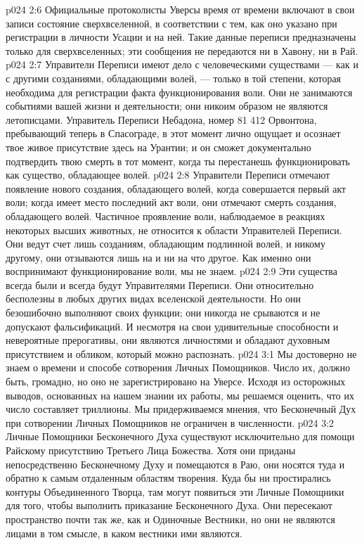 \vs p024 2:6 Официальные протоколисты Уверсы время от времени включают в свои записи состояние сверхвселенной, в соответствии с тем, как оно указано при регистрации в личности Усации и на ней. Такие данные переписи предназначены только для сверхвселенных; эти сообщения не передаются ни в Хавону, ни в Рай.
\vs p024 2:7 \pc Управители Переписи имеют дело с человеческими существами --- как и с другими созданиями, обладающими волей, --- только в той степени, которая необходима для регистрации факта функционирования воли. Они не занимаются событиями вашей жизни и деятельности; они никоим образом не являются летописцами. Управитель Переписи Небадона, номер 81 412 Орвонтона, пребывающий теперь в Спасограде, в этот момент лично ощущает и осознает твое живое присутствие здесь на Урантии; и он сможет документально подтвердить твою смерть в тот момент, когда ты перестанешь функционировать как существо, обладающее волей.
\vs p024 2:8 Управители Переписи отмечают появление нового создания, обладающего волей, когда совершается первый акт воли; когда имеет место последний акт воли, они отмечают смерть создания, обладающего волей. Частичное проявление воли, наблюдаемое в реакциях некоторых высших животных, не относится к области Управителей Переписи. Они ведут счет лишь созданиям, обладающим подлинной волей, и никому другому, они отзываются лишь на  и ни на что другое. Как именно они воспринимают функционирование воли, мы не знаем.
\vs p024 2:9 Эти существа всегда были и всегда будут Управителями Переписи. Они относительно бесполезны в любых других видах вселенской деятельности. Но они безошибочно выполняют своих функции; они никогда не срываются и не допускают фальсификаций. И несмотря на свои удивительные способности и невероятные прерогативы, они являются личностями и обладают духовным присутствием и обликом, который можно распознать.
\vs p024 3:1 Мы достоверно не знаем о времени и способе сотворения Личных Помощников. Число их, должно быть, громадно, но оно не зарегистрировано на Уверсе. Исходя из осторожных выводов, основанных на нашем знании их работы, мы решаемся оценить, что их число составляет триллионы. Мы придерживаемся мнения, что Бесконечный Дух при сотворении Личных Помощников не ограничен в численности.
\vs p024 3:2 Личные Помощники Бесконечного Духа существуют исключительно для помощи Райскому присутствию Третьего Лица Божества. Хотя они приданы непосредственно Бесконечному Духу и помещаются в Раю, они носятся туда и обратно к самым отдаленным областям творения. Куда бы ни простирались контуры Объединенного Творца, там могут появиться эти Личные Помощники для того, чтобы выполнить приказание Бесконечного Духа. Они пересекают пространство почти так же, как и Одиночные Вестники, но они не являются лицами в том смысле, в каком вестники ими являются.
